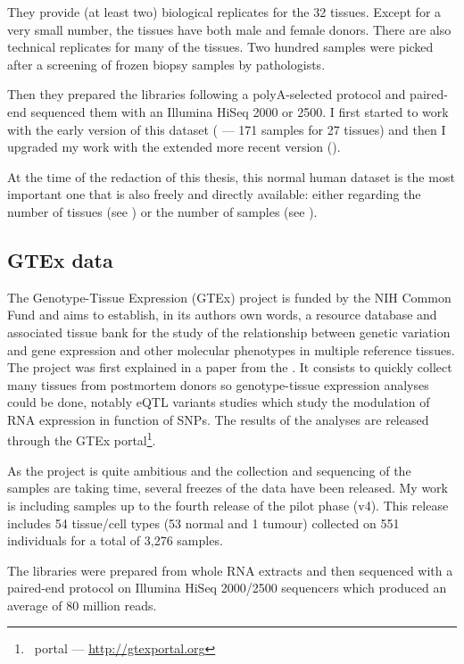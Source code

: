 They provide (at least two) biological replicates for the 32 tissues.
Except for a very small number, the tissues have both male and female donors.
There are also technical replicates for many of the tissues. Two hundred samples
were picked after a screening of frozen biopsy samples by pathologists.

Then they prepared the libraries following a polyA-selected protocol and
paired-end sequenced them with an Illumina HiSeq 2000 or 2500. I first started
to work with the early version of this dataset
( --- 171 samples for 27 tissues)
and then I upgraded my work with the extended more recent version
().

At the time of the redaction of this thesis, this normal human dataset is the
most important one that is also freely and directly available: either regarding
the number of tissues (see )
or the number of samples (see ).


\subsection{GTEx data}

The Genotype-Tissue Expression (\gls{GTEx}) project is funded by the \gls{NIH}
Common Fund and aims to establish, in its authors own words,
a resource database and associated tissue bank
for the study of the relationship between genetic variation and gene expression
and other molecular phenotypes in multiple reference tissues. The project was first
explained in a paper from the \cite{GTEx2013}. It consists to quickly collect
many tissues from postmortem donors so genotype-tissue expression analyses could
be done, notably \gls{eQTL} variants studies which study the modulation
of \gls{RNA} expression in function of \glspl{SNP}. The results of the
analyses are released through the GTEx portal\footnote{\Gtex\ portal --- %
\href{http://gtexportal.org}{http://gtexportal.org}}.

As the project is quite ambitious and the collection and sequencing of the samples
are taking time, several freezes of the data have been released. My work is
including samples up to the fourth release of the pilot phase (v4). This
release includes 54 tissue/cell types (53 normal and 1 tumour)
collected on 551 individuals for a total of 3,276 samples.

The libraries were prepared from whole \gls{RNA} extracts and then sequenced
with a paired-end protocol on Illumina HiSeq 2000/2500 sequencers which produced
an average of 80 million reads.

